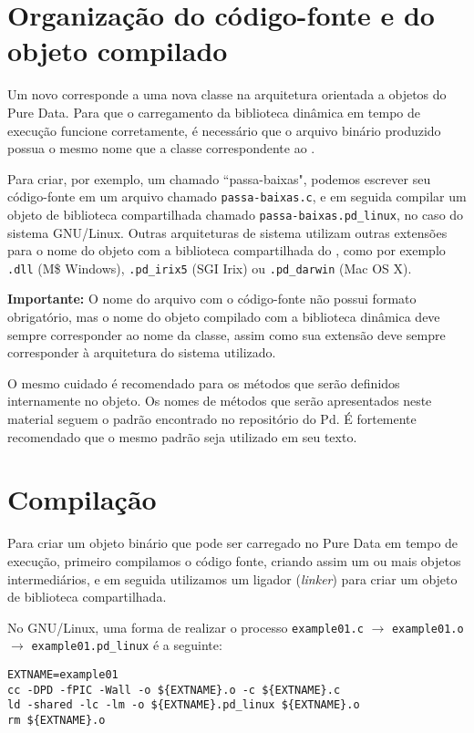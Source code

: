 \section{Organização do código-fonte e do objeto compilado}
\label{sec:organizacao}

Um novo \external corresponde a uma nova classe na arquitetura orientada a
objetos do Pure Data. Para que o carregamento da biblioteca dinâmica
em tempo de execução funcione corretamente, é necessário que o
arquivo binário produzido possua o mesmo nome que a classe correspondente ao
\external.

Para criar, por exemplo, um \external chamado ``passa-baixas", podemos
escrever seu código-fonte em um arquivo chamado \texttt{passa-baixas.c}, e em
seguida compilar um objeto de biblioteca compartilhada chamado
\texttt{passa-baixas.pd\_linux}, no caso do sistema GNU/Linux. Outras
arquiteturas de sistema utilizam outras extensões para o nome do objeto com a
biblioteca compartilhada do \external, como por exemplo \texttt{.dll} (M\$
Windows), \texttt{.pd\_irix5} (SGI Irix) ou \texttt{.pd\_darwin} (Mac OS X).

\textbf{Importante:} O nome do arquivo com o código-fonte não possui formato
obrigatório, mas o nome do objeto compilado com a biblioteca dinâmica deve
sempre corresponder ao nome da classe, assim como sua extensão deve sempre
corresponder à arquitetura do sistema utilizado.

O mesmo cuidado é recomendado para os métodos que serão definidos internamente
no objeto. Os nomes de métodos que serão apresentados neste material seguem o padrão
encontrado no repositório do Pd. É fortemente recomendado que o mesmo padrão seja
utilizado em seu texto.

\section{Compilação}
\label{sec:compiling}

Para criar um objeto binário que pode ser carregado no Pure Data em tempo de
execução, primeiro compilamos o código fonte, criando assim um ou mais objetos
intermediários, e em seguida utilizamos um ligador (\emph{linker}) para criar
um objeto de biblioteca compartilhada.

No GNU/Linux, uma forma de realizar o processo
\texttt{example01.c} $\rightarrow$ \texttt{example01.o} $\rightarrow$
\texttt{example01.pd\_linux} é a seguinte:

\vspace{1em}
\begin{lstlisting}
EXTNAME=example01
cc -DPD -fPIC -Wall -o ${EXTNAME}.o -c ${EXTNAME}.c
ld -shared -lc -lm -o ${EXTNAME}.pd_linux ${EXTNAME}.o
rm ${EXTNAME}.o
\end{lstlisting}

